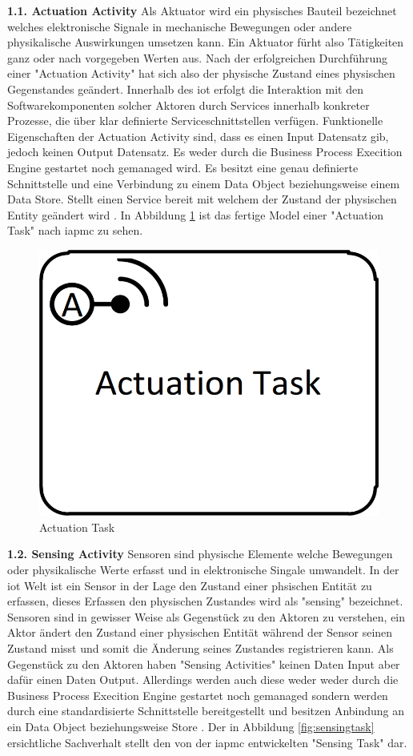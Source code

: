\documentclass[a4paper, 12pt, twoside, headsepline=true]{scrartcl} %
\begin{document}
\textbf{1.1. Actuation Activity}
\newline
Als Aktuator wird ein physisches Bauteil bezeichnet welches elektronische Signale in mechanische Bewegungen oder andere physikalische Auswirkungen umsetzen kann. Ein Aktuator fürht also Tätigkeiten ganz oder nach vorgegeben Werten aus. Nach der erfolgreichen Durchführung einer "Actuation Activity" hat sich also der physische Zustand eines physischen Gegenstandes geändert. Innerhalb des \ac{iot} erfolgt die Interaktion mit den Softwarekomponenten solcher Aktoren durch Services innerhalb konkreter Prozesse, die über klar definierte Serviceschnittstellen verfügen. Funktionelle Eigenschaften der Actuation Activity sind, dass es einen Input Datensatz gib, jedoch keinen Output Datensatz. Es weder durch die Business Process Execition Engine gestartet noch gemanaged wird. Es besitzt eine genau definierte Schnittstelle und eine Verbindung zu einem Data Object beziehungsweise einem Data Store. Stellt einen Service bereit mit welchem der Zustand der physischen Entity geändert wird \cite[S.41]{conceptsiotawarepm}. In Abbildung \ref{fig:actuationtask} ist das fertige Model einer "Actuation Task" nach \ac{iapmc} zu sehen.

\begin{figure}[H]
	\includegraphics[height=3 cm,keepaspectratio,center]{figures/ActuationTask}
	\caption{Actuation Task \cite[S.44]{conceptsiotawarepm}}
	\label{fig:actuationtask}
\end{figure} 

\textbf{1.2. Sensing Activity}
\newline
Sensoren sind physische Elemente welche Bewegungen oder physikalische Werte erfasst und in elektronische Singale umwandelt. In der \ac{iot} Welt ist ein Sensor in der Lage den Zustand einer phsischen Entität zu erfassen, dieses Erfassen den physischen Zustandes wird als "sensing" bezeichnet. Sensoren sind in gewisser Weise als Gegenstück zu den Aktoren zu verstehen, ein Aktor ändert den Zustand einer physischen Entität während der Sensor seinen Zustand misst und somit die Änderung seines Zustandes registrieren kann. Als Gegenstück zu den Aktoren haben "Sensing Activities" keinen Daten Input aber dafür einen Daten Output. Allerdings werden auch diese weder weder durch die Business Process Execition Engine gestartet noch gemanaged sondern werden durch eine standardisierte Schnittstelle bereitgestellt und besitzen Anbindung an ein Data Object beziehungsweise Store \cite[S.45]{conceptsiotawarepm}. Der in Abbildung \ref{fig:sensingtask} ersichtliche Sachverhalt stellt den von der \ac{iapmc} entwickelten "Sensing Task" dar.
\end{document}

